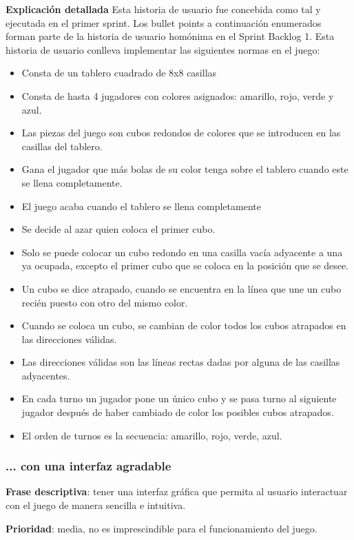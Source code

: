 \documentclass[../../SCRUM.tex]{subfiles}
\begin{document}
\textbf{Explicación detallada}
Esta historia de usuario fue concebida como tal y ejecutada en el primer sprint. Los  bullet points a continuación enumerados forman parte de la historia de usuario homónima en el Sprint Backlog 1.
Esta historia de usuario conlleva implementar las siguientes normas en el juego:
\begin{itemize}
\item Consta de un tablero cuadrado de 8x8 casillas
\item Consta de hasta 4 jugadores con colores asignados: amarillo, rojo, verde y azul.
\item Las piezas del juego son cubos redondos de colores que se introducen en las casillas del tablero.
\item Gana el jugador que más bolas de su color tenga sobre el tablero cuando este se llena completamente.
\item El juego acaba cuando el tablero se llena completamente
\item Se decide al azar quien coloca el primer cubo.
\item Solo se puede colocar un cubo redondo en una casilla vacía adyacente a una ya ocupada, excepto el primer cubo que se coloca en la posición que se desee.
\item Un cubo se dice atrapado, cuando se encuentra en la línea que une un cubo recién puesto con otro del mismo color.
\item Cuando se coloca un cubo, se cambian de color todos los cubos atrapados en las direcciones válidas.
\item Las direcciones válidas son las líneas rectas dadas por alguna de las casillas adyacentes.
\item En cada turno un jugador pone un único cubo y se pasa turno al siguiente jugador después de haber cambiado de color los posibles cubos atrapados.
\item El orden de turnos es la secuencia: amarillo, rojo, verde, azul.\end{itemize}

\subsubsection{... con una interfaz agradable}
\textbf{Frase descriptiva}: tener una interfaz gráfica que permita al usuario interactuar con el juego de manera sencilla e intuitiva.

\textbf{Prioridad}: media, no es imprescindible para el funcionamiento del juego.
\end{document}
